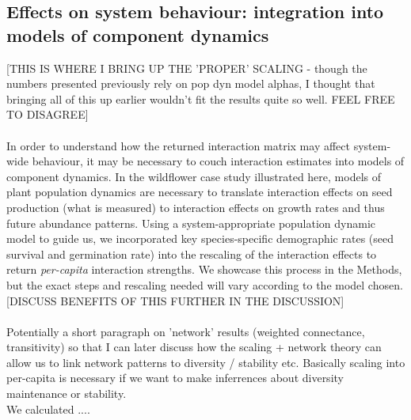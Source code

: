 \documentclass[a4,12pt]{article}
\begin{document}
\begin{itemize}
    \subsection{Effects on system behaviour: integration into models of component dynamics}

    [THIS IS WHERE I BRING UP THE 'PROPER' SCALING - though the numbers presented previously rely on pop dyn model alphas, I thought that bringing all of this up earlier wouldn't fit the results quite so well. FEEL FREE TO DISAGREE]


    \paragraph{}
    In order to understand how the returned interaction matrix may affect system-wide behaviour, it may be necessary to couch interaction estimates into models of component dynamics. In the wildflower case study illustrated here, models of plant population dynamics are necessary to translate interaction effects on seed production (what is measured) to interaction effects on growth rates and thus future abundance patterns. Using a system-appropriate population dynamic model to guide us, we incorporated key species-specific demographic rates (seed survival and germination rate) into the rescaling of the interaction effects to return \textit{per-capita} interaction strengths. We showcase this process in the Methods, but the exact steps and rescaling needed will vary according to the model chosen. [DISCUSS BENEFITS OF THIS FURTHER IN THE DISCUSSION] 

    \paragraph{}
    Potentially a short paragraph on 'network' results (weighted connectance, transitivity) so that I can later discuss how the scaling + network theory can allow us to link network patterns to diversity / stability etc. Basically scaling into per-capita is necessary if we want to make inferrences about diversity maintenance or stability. \\
    We calculated .... 


\end{itemize}
\end{document}
